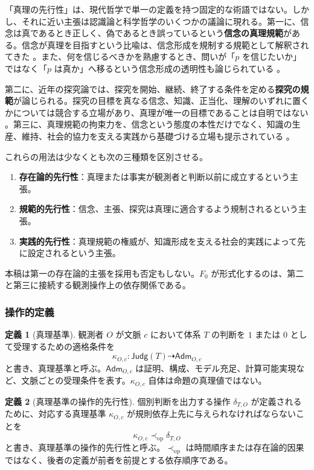 \documentclass[a4paper,11pt]{ltjsarticle}
\theoremstyle{definition}
\newtheorem{definition}{定義}[section]
\theoremstyle{plain}
\newcommand{\TruthCriterion}{\kappa}
\begin{document}
「真理の先行性」は、現代哲学で単一の定義を持つ固定的な術語ではない。しかし、それに近い主張は認識論と科学哲学のいくつかの議論に現れる。第一に、信念は真であるとき正しく、偽であるとき誤っているという\textbf{信念の真理規範}がある。信念が真理を目指すという比喩は、信念形成を規制する規範として解釈されてきた \cite{Wedgwood2002}。また、何を信じるべきかを熟慮するとき、問いが「$p$ を信じたいか」ではなく「$p$ は真か」へ移るという信念形成の透明性も論じられている \cite{ShahVelleman2005}。

第二に、近年の探究論では、探究を開始、継続、終了する条件を定める\textbf{探究の規範}が論じられる。探究の目標を真なる信念、知識、正当化、理解のいずれに置くかについては競合する立場があり、真理が唯一の目標であることは自明ではない \cite{Haziza2023}。第三に、真理規範の拘束力を、信念という態度の本性だけでなく、知識の生産、維持、社会的協力を支える実践から基礎づける立場も提示されている \cite{Wei2024}。

これらの用法は少なくとも次の三種類を区別させる。
\begin{enumerate}
 \item \textbf{存在論的先行性}：真理または事実が観測者と判断以前に成立するという主張。
 \item \textbf{規範的先行性}：信念、主張、探究は真理に適合するよう規制されるという主張。
 \item \textbf{実践的先行性}：真理規範の権威が、知識形成を支える社会的実践によって先に設定されるという主張。
\end{enumerate}
本稿は第一の存在論的主張を採用も否定もしない。$F_0$ が形式化するのは、第二と第三に接続する観測操作上の依存関係である。

\subsubsection{操作的定義}

\begin{definition}[真理基準]
観測者 $O$ が文脈 $c$ において体系 $T$ の判断を $1$ または $0$ として受理するための適格条件を
\[
 \TruthCriterion_{O,c}
 :
 \mathsf{Judg}(T)
 \dashrightarrow
 \mathsf{Adm}_{O,c}
\]
と書き、真理基準と呼ぶ。$\mathsf{Adm}_{O,c}$ は証明、構成、モデル充足、計算可能実現など、文脈ごとの受理条件を表す。$\TruthCriterion_{O,c}$ 自体は命題の真理値ではない。
\end{definition}

\begin{definition}[真理基準の操作的先行性]
個別判断を出力する操作 $\delta_{T,O}$ が定義されるために、対応する真理基準 $\TruthCriterion_{O,c}$ が規則依存上先に与えられなければならないことを
\[
 \TruthCriterion_{O,c}
 \prec_{\mathrm{op}}
 \delta_{T,O}
\]
と書き、真理基準の操作的先行性と呼ぶ。$\prec_{\mathrm{op}}$ は時間順序または存在論的因果ではなく、後者の定義が前者を前提とする依存順序である。
\end{definition}
\end{document}
